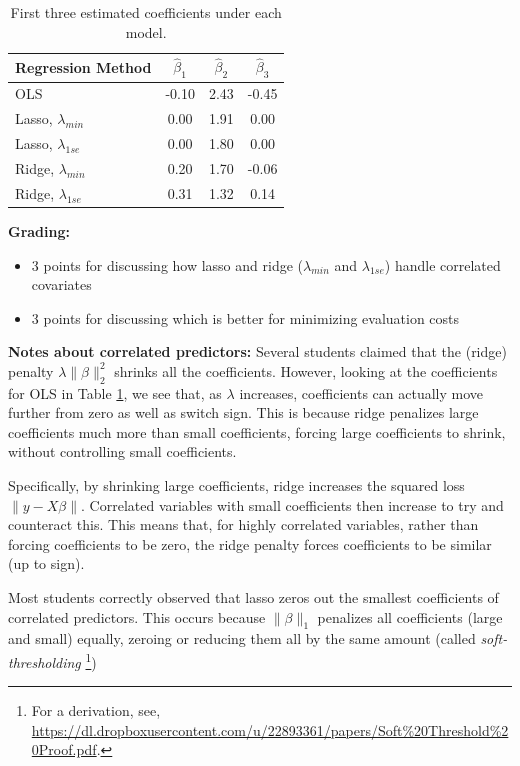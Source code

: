 \documentclass[12pt]{article}
\renewcommand{\hat}{\widehat}
\newcommand{\1}{\mathbbm{1}}
\begin{document}
\begin{enumerate}
\begin{table}[h]
\centering
\begin{tabular}{|l|c|c|c|}
\hline
Regression Method       & $\hat\beta_1$ & $\hat\beta_2$ & $\hat\beta_3$ \\
\hline
OLS                     & -0.10         & 2.43          & -0.45         \\
\hline
Lasso, $\lambda_{min}$  & 0.00          & 1.91          & 0.00          \\
\hline
Lasso, $\lambda_{1se}$  & 0.00          & 1.80          & 0.00          \\
\hline
Ridge, $\lambda_{min}$  & 0.20          & 1.70          & -0.06         \\
\hline
Ridge, $\lambda_{1se}$  & 0.31          & 1.32          & 0.14          \\
\hline
\end{tabular}
\caption{First three estimated coefficients under each model.}
\label{tab:3coeffs}
\end{table}

{\bf Grading:}
\begin{itemize}
\item 3 points for discussing how lasso and ridge ($\lambda_{min}$ and
$\lambda_{1se}$) handle correlated covariates
\item 3 points for discussing which is better for minimizing evaluation costs
\end{itemize}

{\bf Notes about correlated predictors:} Several students claimed that the
(ridge) penalty $\lambda \|\beta\|_2^2$ shrinks all the coefficients. However,
looking at the coefficients for OLS in Table \ref{tab:3coeffs}, we see that, as
$\lambda$ increases, coefficients can actually move further from zero as well
as switch sign. This is because ridge penalizes large coefficients much more
than small coefficients, forcing large coefficients to shrink, without
controlling small coefficients.

Specifically, by shrinking large coefficients, ridge increases the squared loss
$\|y - X\beta\|$. Correlated variables with small coefficients then increase to
try and counteract this. This means that, for highly correlated variables,
rather than forcing coefficients to be zero, the ridge penalty forces
coefficients to be similar (up to sign).

Most students correctly observed that lasso zeros out the smallest coefficients
of correlated predictors. This occurs because $\|\beta\|_1$ penalizes all
coefficients (large and small) equally, zeroing or reducing them all by the
same amount (called \emph{soft-thresholding}
\footnote{For a derivation, see,
\url{https://dl.dropboxusercontent.com/u/22893361/papers/Soft\%20Threshold\%20Proof.pdf}.})


\end{enumerate}
\end{document}
